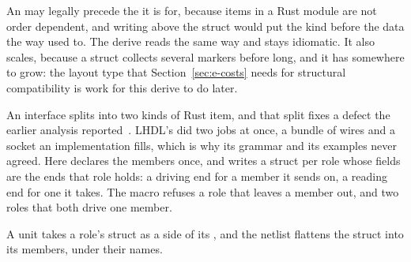 An  may legally precede the  it is for, because
items in a Rust module are not order dependent, and writing
 above the struct would put the kind
before the data the way  used to.
The derive reads the same way and stays idiomatic. It also scales, because
a struct collects several markers before long, and it has somewhere to
grow: the layout type that Section~\ref{sec:e-costs} needs for structural
compatibility is work for this derive to do later.

An interface splits into two kinds of Rust item, and that split fixes a
defect the earlier analysis reported~\cite{unification}. LHDL's
 did two jobs at once, a bundle of wires and a socket an
implementation fills, which is why its grammar and its examples never
agreed. Here  declares the members once, and writes a
struct per role whose fields are the ends that role holds: a driving end
for a member it sends on, a reading end for one it takes. The macro
refuses a role that leaves a member out, and two roles that both drive
one member.



A unit takes a role's struct as a side of its , and the
netlist flattens the struct into its members, under their names.
